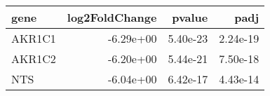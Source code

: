 \begin{tabular}{lrrr}
\toprule
  gene &  log2FoldChange &   pvalue &     padj \\
\midrule
AKR1C1 &       -6.29e+00 & 5.40e-23 & 2.24e-19 \\
AKR1C2 &       -6.20e+00 & 5.44e-21 & 7.50e-18 \\
   NTS &       -6.04e+00 & 6.42e-17 & 4.43e-14 \\
\bottomrule
\end{tabular}
